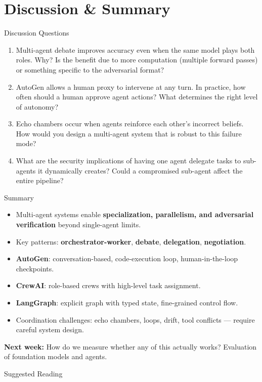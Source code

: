 \documentclass[aspectratio=169,10pt]{beamer}
\begin{document}
\section{Discussion \& Summary}
\begin{frame}{Discussion Questions}
  \begin{enumerate}
    \item Multi-agent debate improves accuracy even when the same model plays both roles. Why? Is the benefit due to more computation (multiple forward passes) or something specific to the adversarial format?
    \item AutoGen allows a human proxy to intervene at any turn. In practice, how often should a human approve agent actions? What determines the right level of autonomy?
    \item Echo chambers occur when agents reinforce each other's incorrect beliefs. How would you design a multi-agent system that is robust to this failure mode?
    \item What are the security implications of having one agent delegate tasks to sub-agents it dynamically creates? Could a compromised sub-agent affect the entire pipeline?
  \end{enumerate}
\end{frame}

\begin{frame}{Summary}
  \begin{itemize}
    \item Multi-agent systems enable \textbf{specialization, parallelism, and adversarial verification} beyond single-agent limits.
    \item Key patterns: \textbf{orchestrator-worker}, \textbf{debate}, \textbf{delegation}, \textbf{negotiation}.
    \item \textbf{AutoGen}: conversation-based, code-execution loop, human-in-the-loop checkpoints.
    \item \textbf{CrewAI}: role-based crews with high-level task assignment.
    \item \textbf{LangGraph}: explicit graph with typed state, fine-grained control flow.
    \item Coordination challenges: echo chambers, loops, drift, tool conflicts — require careful system design.
  \end{itemize}
  \vspace{0.3em}
  \textbf{Next week:} How do we measure whether any of this actually works? Evaluation of foundation models and agents.
\end{frame}

\begin{frame}[allowframebreaks]{Suggested Reading}
  \nocite{wu2023autogen, hong2023metagpt, chen2023agentverse, park2023generative}
  
\end{frame}
\end{document}
